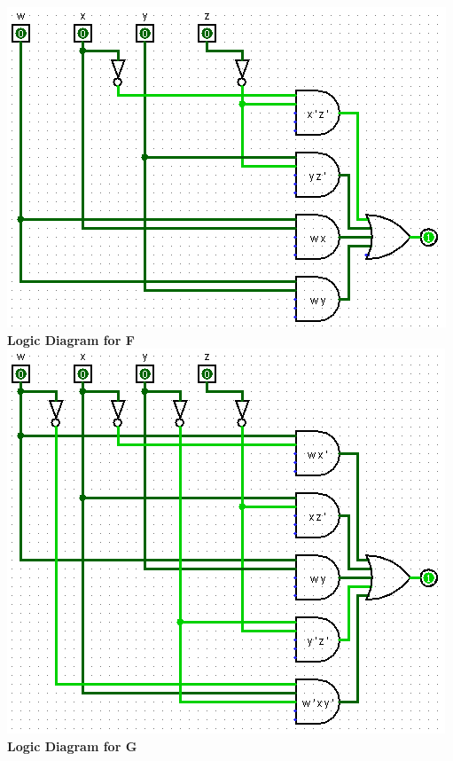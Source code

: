 \documentclass{article}
\begin{document}
\begin{enumerate}[label=\arabic*]
    \includegraphics[scale=.72]{E.PNG} \\
    \newpage
    \textbf{Logic Diagram for F} \\
    \includegraphics[scale=.72]{F.PNG} \\
    \hfill
    \textbf{Logic Diagram for G} \\

\end{enumerate}
\end{document}
